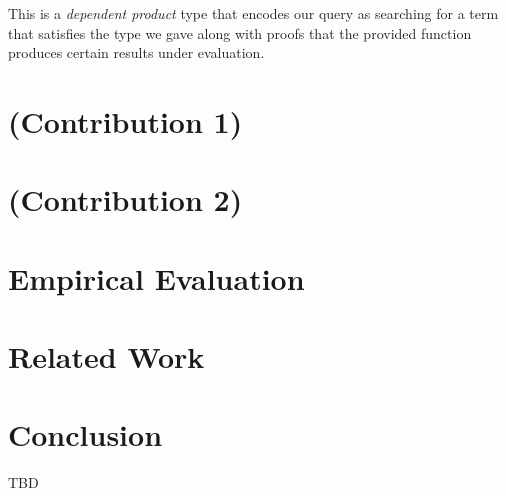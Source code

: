 \documentclass[acmsmall,review,authorversion]{acmart}
\begin{document}
This is a \textit{dependent product} type that encodes our query as searching
for a term that satisfies the type we gave along with proofs that the provided
function produces certain results under evaluation. 


\section{(Contribution 1)}

\section{(Contribution 2)}

\section{Empirical Evaluation}

\section{Related Work}

\section{Conclusion}

\begin{acks}
TBD
\end{acks}



\end{document}
